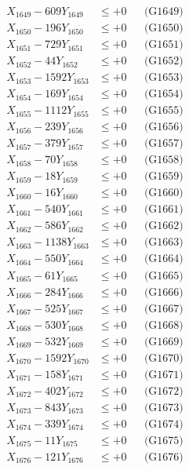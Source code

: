 \documentclass[a4paper,10pt]{article}
\begin{document}
{\begin{align}
X_{1649} - 609Y_{1649} &\leq +0 && \text{(G1649)} \\
X_{1650} - 196Y_{1650} &\leq +0 && \text{(G1650)} \\
\allowbreak
X_{1651} - 729Y_{1651} &\leq +0 && \text{(G1651)} \\
X_{1652} - 44Y_{1652} &\leq +0 && \text{(G1652)} \\
X_{1653} - 1592Y_{1653} &\leq +0 && \text{(G1653)} \\
X_{1654} - 169Y_{1654} &\leq +0 && \text{(G1654)} \\
X_{1655} - 1112Y_{1655} &\leq +0 && \text{(G1655)} \\
X_{1656} - 239Y_{1656} &\leq +0 && \text{(G1656)} \\
X_{1657} - 379Y_{1657} &\leq +0 && \text{(G1657)} \\
X_{1658} - 70Y_{1658} &\leq +0 && \text{(G1658)} \\
X_{1659} - 18Y_{1659} &\leq +0 && \text{(G1659)} \\
X_{1660} - 16Y_{1660} &\leq +0 && \text{(G1660)} \\
\allowbreak
X_{1661} - 540Y_{1661} &\leq +0 && \text{(G1661)} \\
X_{1662} - 586Y_{1662} &\leq +0 && \text{(G1662)} \\
X_{1663} - 1138Y_{1663} &\leq +0 && \text{(G1663)} \\
X_{1664} - 550Y_{1664} &\leq +0 && \text{(G1664)} \\
X_{1665} - 61Y_{1665} &\leq +0 && \text{(G1665)} \\
X_{1666} - 284Y_{1666} &\leq +0 && \text{(G1666)} \\
X_{1667} - 525Y_{1667} &\leq +0 && \text{(G1667)} \\
X_{1668} - 530Y_{1668} &\leq +0 && \text{(G1668)} \\
X_{1669} - 532Y_{1669} &\leq +0 && \text{(G1669)} \\
X_{1670} - 1592Y_{1670} &\leq +0 && \text{(G1670)} \\
\allowbreak
X_{1671} - 158Y_{1671} &\leq +0 && \text{(G1671)} \\
X_{1672} - 402Y_{1672} &\leq +0 && \text{(G1672)} \\
X_{1673} - 843Y_{1673} &\leq +0 && \text{(G1673)} \\
X_{1674} - 339Y_{1674} &\leq +0 && \text{(G1674)} \\
X_{1675} - 11Y_{1675} &\leq +0 && \text{(G1675)} \\
X_{1676} - 121Y_{1676} &\leq +0 && \text{(G1676)} \\

\end{align}}
\end{document}
